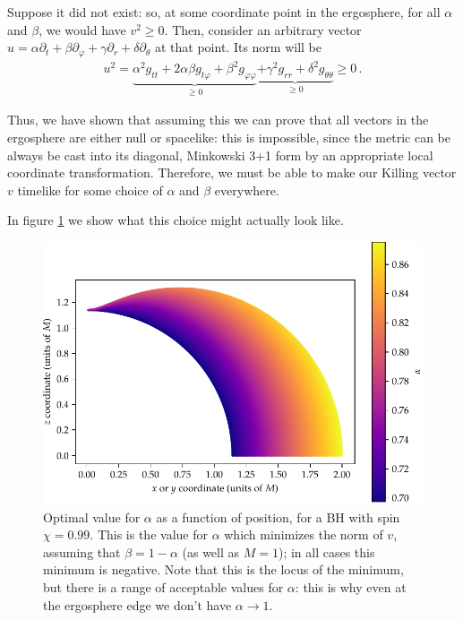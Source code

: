 \documentclass[main.tex]{subfiles}
\begin{document}
Suppose it did not exist: so, at some coordinate point in the ergosphere, for all \(\alpha \) and \(\beta \), we would have \(v^2 \geq 0\). 
Then, consider an arbitrary vector \(u = \alpha \partial_t + \beta \partial_\varphi + \gamma \partial_r + \delta \partial_\theta \) at that point. 
Its norm will be  
%
\begin{align}
u^2 = \underbrace{\alpha^2 g_{tt} + 2 \alpha \beta g_{t \varphi } + \beta^2 g_{\varphi \varphi }}_{\geq 0} \underbrace{+ \gamma^2 g_{rr} + \delta^2 g_{\theta \theta }}_{\geq 0} \geq 0
\,.
\end{align}

Thus, we have shown that assuming this we can prove that all vectors in the ergosphere are either null or spacelike: 
this is impossible, since the metric can be always be cast into its diagonal, Minkowski 3+1 form by an appropriate local coordinate transformation.
Therefore, we must be able to make our Killing vector \(v\) timelike for some choice of \(\alpha \) and \(\beta \) everywhere.

In figure \ref{fig:kerr_killing} we show what this choice might actually look like.

\begin{figure}[ht]
\centering
\includegraphics[width=\textwidth]{figures/kerr_killing}
\caption{Optimal value for \(\alpha \) as a function of position, for a BH with spin \(\chi = 0.99\). This is the value for \(\alpha \) which minimizes the norm of \(v\), assuming that \(\beta = 1 - \alpha \) (as well as \(M = 1\)); in all cases this minimum is negative.
Note that this is the locus of the minimum, but there is a range of acceptable values for \(\alpha \): this is why even at the ergosphere edge we don't have \(\alpha \to 1\). }
\label{fig:kerr_killing}
\end{figure}
\end{document}
